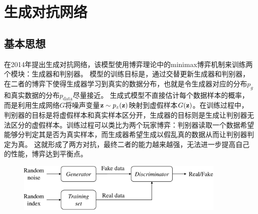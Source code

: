 

\section{生成对抗网络}
\subsection{基本思想}
\citet{goodfellow2014generative}在2014年提出生成对抗网络，该模型使用博弈理论中的minimax博弈机制来训练两个模块：生成器和判别器。
模型的训练目标是，通过交替更新生成器和判别器，在二者的博弈下使得生成器学习到真实的数据分布，也就是令生成器对应的分布$p_g$和真实数据的分布$p_{\text{data}}$尽量接近。
生成式模型不直接估计每个数据样本的概率，而是利用生成网络$G$将噪声变量$\mathbf{z} \sim p_z(\mathbf{z})$映射到虚假样本$G(\mathbf{z})$。在训练过程中，判别器的目标是将虚假样本和真实样本区分开，生成器的目标则是生成让判别器无法区分的虚假样本。训练过程可以类比为两个玩家博弈：判别器读取一个数据希望能够分判定其是否为真实样本，而生成器希望生成以假乱真的数据从而让判别器判定为真。
这就形成了两方对抗，最终二者的能力越来越强，无法进一步提高自己的性能，博弈达到平衡点。
\begin{figure}[htbp]
  \centering
  \includegraphics[width=0.9\textwidth]{Img/arch-gan.pdf}
  \label{fig:arch-gan}
\end{figure}

